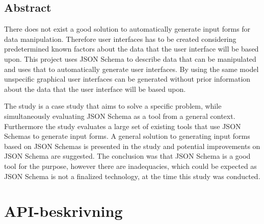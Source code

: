 \documentclass[10pt,a4paper,titlepage,twoside]{report}
\begin{document}
\section*{Abstract}
There does not exist a good solution to automatically generate input forms for data manipulation. Therefore user interfaces has to be created considering predetermined known factors about the data that the user interface will be based upon. This project uses JSON Schema to describe data that can be manipulated and uses that to automatically generate user interfaces. By using the same model unspecific graphical user interfaces can be generated without prior information about the data that the user interface will be based upon.

The study is a case study that aims to solve a specific problem, while simultaneously evaluating JSON Schema as a tool from a general context. Furthermore the study evaluates a large set of existing tools that use JSON Schemas to generate input forms. A general solution to generating input forms based on JSON Schemas is presented in the study and potential improvements on JSON Schema are suggested. The conclusion was that JSON Schema is a good tool for the purpose, however there are inadequacies, which could be expected as JSON Schema is not a finalized technology, at the time this study was conducted.

\clearpage

\setlength{\parskip}{0pt}

\tableofcontents

\setlength{\parskip}{\baselineskip}


\mainmatter








\printbibliography[heading=bibintoc] %

\appendix

\chapter{API-beskrivning}
\label{appendix:api-beskrivning}
\end{document}
